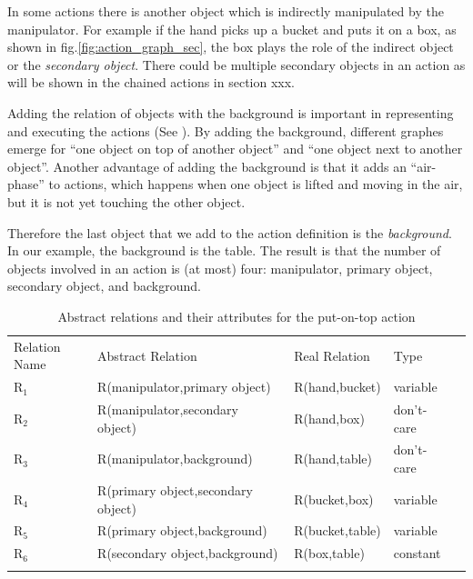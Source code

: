 In some actions there is another object which is indirectly manipulated by the manipulator.
For example if the hand picks up a bucket and puts it on a box, as shown in fig.\ref{fig:action_graph_sec},
the box plays the role of the indirect object or the \textit{secondary object}.
There could be multiple secondary objects in an action as will be shown in the chained actions in section xxx.

Adding the relation of objects with the background is important in representing and executing the actions (See \cite{TAMD13}).
By adding the background, different graphes emerge for ``one object on top of another object'' and ``one object next to another object''.
Another advantage of adding the background is that it adds an ``air-phase'' to actions,
which happens when one object is lifted and moving in the air, but it is not yet touching the other object.

Therefore the last object that we add to the action definition is the \textit{background}.
In our example, the background is the table.
The result is that the number of objects involved in an action is (at most) four: manipulator, primary object, secondary object, and background.

\begin{table}
\centering
\caption{Abstract relations and their attributes for the put-on-top action}
\begin{tabular}{ lllll }
\hline\noalign{\smallskip}
Relation Name & Abstract Relation & Real Relation & Type \\
\noalign{\smallskip}\hline\noalign{\smallskip}
$\text{R}_1$  & R(manipulator,primary object) & R(hand,bucket) & variable \\
$\text{R}_2$  & R(manipulator,secondary object)& R(hand,box) & don't-care \\
$\text{R}_3$  & R(manipulator,background) & R(hand,table) & don't-care \\
$\text{R}_4$  & R(primary object,secondary object) & R(bucket,box) & variable  \\
$\text{R}_5$  & R(primary object,background) & R(bucket,table) & variable \\
$\text{R}_6$  & R(secondary object,background)& R(box,table) & constant \\
\noalign{\smallskip}\hline
\end{tabular}
\label{tab:relations}
\end{table}

